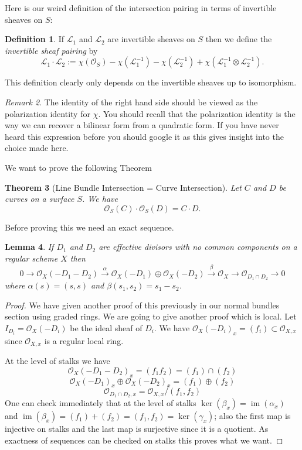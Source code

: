 \documentclass[12pt]{article}
\numberwithin{equation}{section}
\newtheorem{theorem}{Theorem}[subsection]
\newtheorem{lemma}[theorem]{Lemma}
\theoremstyle{definition}
\newtheorem{definition}[theorem]{Definition}
\theoremstyle{remark}
\newtheorem{remark}[theorem]{Remark}
\newcommand{\Ocal}{\mathcal{O}}
\newcommand{\Lcal}{\mathcal{L}}
\newcommand{\im}{\operatorname{im}}
\begin{document}
Here is our weird definition of the intersection pairing in terms of invertible sheaves on $S$:
\begin{definition}
If $\Lcal_1$ and $\Lcal_2$ are invertible sheaves on $S$ then we define the \emph{invertible sheaf pairing} by 
 $$ \Lcal_1 \cdot \Lcal_2 := \chi(\Ocal_S) - \chi(\Lcal_1^{-1}) - \chi(\Lcal_2^{-1}) +\chi(\Lcal_1^{-1}\otimes \Lcal_2^{-1}). $$
\end{definition}
This definition clearly only depends on the invertible sheaves up to isomorphism.
\begin{remark}
	The identity of the right hand side should be viewed as the polarization identity for $\chi$. 
	You should recall that the polarization identity is the way we can recover a bilinear form from a quadratic form. 
	If you have never heard this expression before you should google it as this gives insight into the choice made here.
\end{remark}

We want to prove the following Theorem
\begin{theorem}[Line Bundle Intersection = Curve Intersection]
	Let $C$ and $D$ be curves on a surface $S$. 
	We have 
	 $$ \Ocal_S(C) \cdot \Ocal_S(D) = C\cdot D.$$
\end{theorem}

Before proving this we need an exact sequence. 
\begin{lemma}
If $D_1$ and $D_2$ are effective divisors with no common components on a regular scheme $X$ then 
 $$0 \to \Ocal_X(-D_1-D_2) \xrightarrow{\alpha} \Ocal_X(-D_1) \oplus \Ocal_X(-D_2) \xrightarrow{\beta} \Ocal_X \to \Ocal_{D_1\cap D_2} \to 0 $$
where $\alpha(s) = (s,s)$ and $\beta(s_1,s_2) = s_1-s_2$. 
\end{lemma}
\begin{proof}
	We have given another proof of this previously in our normal bundles section using graded rings. 
	We are going to give another proof which is local. 
	Let $I_{D_i}=\Ocal_X(-D_i)$ be the ideal sheaf of $D_i$. 
	We have $\Ocal_X(-D_i)_x = (f_i) \subset \Ocal_{X,x}$ since $\Ocal_{X,x}$ is a regular local ring. 
	
	At the level of stalks we have 
	 $$\Ocal_X(-D_1-D_2)_x = (f_1f_2) = (f_1) \cap (f_2) $$
	 $$\Ocal_X(-D_1)_x \oplus \Ocal_X(-D_2)_x = (f_1)\oplus (f_2) $$
	 $$\Ocal_{D_1\cap D_2,x} = \Ocal_{X,x}/(f_1,f_2) $$
	One can check immediately that at the level of stalks $\ker(\beta_x) = \im(\alpha_x)$ and $\im(\beta_x) = (f_1)+(f_2)=(f_1,f_2) = \ker(\gamma_x)$; also the first map is injective on stalks and the last map is surjective since it is a quotient. 
	As exactness of sequences can be checked on stalks this proves what we want. 
\end{proof}
 
\end{document}
